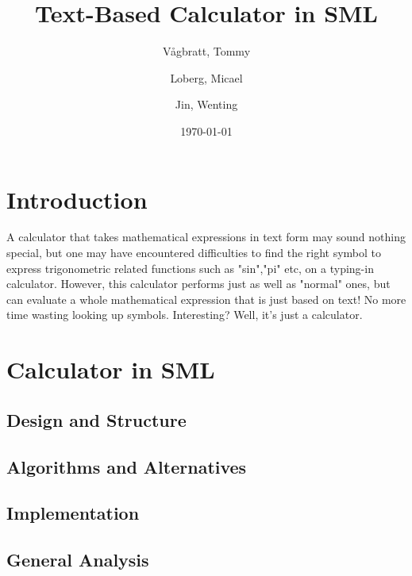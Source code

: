\documentclass[12pt,a4paper]{article}
\begin{document}
\title{Text-Based Calculator in SML}
\author{
  Vågbratt, Tommy
  \and
  Loberg, Micael
	\and
  Jin, Wenting}
\date{\today}
\maketitle
\tableofcontents
\newpage


\section{Introduction}
\textnormal{A calculator that takes mathematical expressions in text form may sound nothing special, but one may have encountered difficulties to find the right symbol to express trigonometric related functions such as "sin","pi" etc, on a typing-in calculator. However, this calculator performs just as well as "normal" ones, but can evaluate a whole mathematical expression that is just based on text! No more time wasting looking up symbols. Interesting? Well, it's just a calculator.}

\section{Calculator in SML}
\subsection{Design and Structure}
\textnormal{}
\iffalse
En mer detaljerad beskrivning (design)
• Vilka delar består systemet av? Hur samverkar de för att lösa problemet?
• Vilka datastrukturer används? Beskriv abstrakta datatyper (gränssnitt/interface)
\fi

\subsection{Algorithms and Alternatives}
\textnormal{}
\iffalse
Smarta lösningar (algoritmer)
• Beskriv viktiga funktioner Designval
• Finns alternativa sätt att lösa problemet? Varför valde du det här sättet?
• Konsekvenser av dina val
\fi

\subsection{Implementation}
\textnormal{}
\iffalse
• Intressanta detaljer
• Fungerar programmet? Hur vet du det?
• Finns det saker som inte fungerar, fall som inte hanteras?
• Är programmet effektivt?
\fi

\subsection{General Analysis}
\textnormal{}
\iffalse
Analys/diskussion
• Vilka är systemets styrkor/svagheter? -> Sustainability
• Blev det bra? Skulle du ha gjort något annorlunda om du skulle börja om? -> Sustainability
• Tänkbara vidareutvecklingar -> Furture Development
\fi
\end{document}
